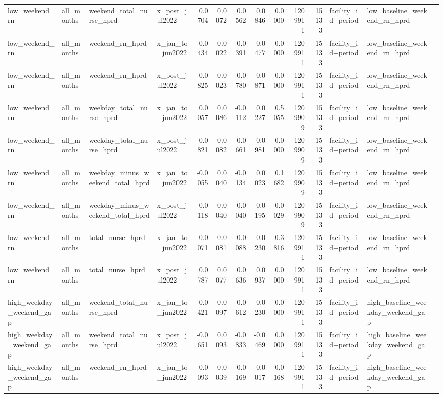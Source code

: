\begin{tabular}{llllrrrrrrrlll}
low_weekend_rn & all_months & weekend_total_nurse_hprd & x_post_jul2022 & 0.0704 & 0.0072 & 0.0562 & 0.0846 & 0.0000 & 1209911 & 15133 & facility_id+period & low_baseline_weekend_rn_hprd &  \\
low_weekend_rn & all_months & weekend_rn_hprd & x_jan_to_jun2022 & 0.0434 & 0.0022 & 0.0391 & 0.0477 & 0.0000 & 1209911 & 15133 & facility_id+period & low_baseline_weekend_rn_hprd &  \\
low_weekend_rn & all_months & weekend_rn_hprd & x_post_jul2022 & 0.0825 & 0.0023 & 0.0780 & 0.0871 & 0.0000 & 1209911 & 15133 & facility_id+period & low_baseline_weekend_rn_hprd &  \\
low_weekend_rn & all_months & weekday_total_nurse_hprd & x_jan_to_jun2022 & 0.0057 & 0.0086 & -0.0112 & 0.0227 & 0.5055 & 1209909 & 15133 & facility_id+period & low_baseline_weekend_rn_hprd &  \\
low_weekend_rn & all_months & weekday_total_nurse_hprd & x_post_jul2022 & 0.0821 & 0.0082 & 0.0661 & 0.0981 & 0.0000 & 1209909 & 15133 & facility_id+period & low_baseline_weekend_rn_hprd &  \\
low_weekend_rn & all_months & weekday_minus_weekend_total_hprd & x_jan_to_jun2022 & -0.0055 & 0.0040 & -0.0134 & 0.0023 & 0.1682 & 1209909 & 15133 & facility_id+period & low_baseline_weekend_rn_hprd &  \\
low_weekend_rn & all_months & weekday_minus_weekend_total_hprd & x_post_jul2022 & 0.0118 & 0.0040 & 0.0040 & 0.0195 & 0.0029 & 1209909 & 15133 & facility_id+period & low_baseline_weekend_rn_hprd &  \\
low_weekend_rn & all_months & total_nurse_hprd & x_jan_to_jun2022 & 0.0071 & 0.0081 & -0.0088 & 0.0230 & 0.3816 & 1209911 & 15133 & facility_id+period & low_baseline_weekend_rn_hprd &  \\
low_weekend_rn & all_months & total_nurse_hprd & x_post_jul2022 & 0.0787 & 0.0077 & 0.0636 & 0.0937 & 0.0000 & 1209911 & 15133 & facility_id+period & low_baseline_weekend_rn_hprd &  \\
high_weekday_weekend_gap & all_months & weekend_total_nurse_hprd & x_jan_to_jun2022 & -0.0421 & 0.0097 & -0.0612 & -0.0230 & 0.0000 & 1209911 & 15133 & facility_id+period & high_baseline_weekday_weekend_gap &  \\
high_weekday_weekend_gap & all_months & weekend_total_nurse_hprd & x_post_jul2022 & -0.0651 & 0.0093 & -0.0833 & -0.0469 & 0.0000 & 1209911 & 15133 & facility_id+period & high_baseline_weekday_weekend_gap &  \\
high_weekday_weekend_gap & all_months & weekend_rn_hprd & x_jan_to_jun2022 & -0.0093 & 0.0039 & -0.0169 & -0.0017 & 0.0168 & 1209911 & 15133 & facility_id+period & high_baseline_weekday_weekend_gap &  \\

\end{tabular}
